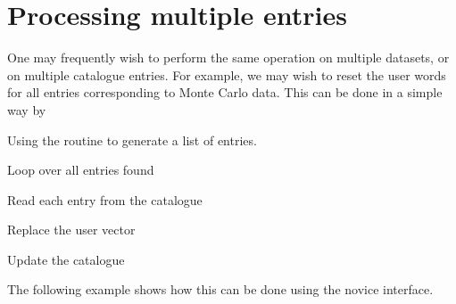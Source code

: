\section{Processing multiple entries}

One may frequently wish to perform the same operation on
multiple datasets, or on multiple catalogue entries.
For example, we may wish to reset the user words
for all entries corresponding to Monte Carlo data.
This can be done in a simple way by

\begin{UL}
\item Using the  routine to generate a list of entries.
\item Loop over all entries found
\item Read each entry from the catalogue
\item Replace the user vector
\item Update the catalogue
\end{UL}

The following example shows how this can be done using
the novice interface.

